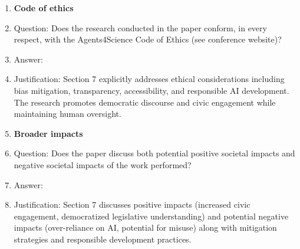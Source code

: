 \documentclass[11pt]{article}
\begin{document}
\begin{enumerate}
\item {\bf Code of ethics}
    \item[] Question: Does the research conducted in the paper conform, in every respect, with the Agents4Science Code of Ethics (see conference website)?
    \item[] Answer: \answerYes{} 
    \item[] Justification: Section 7 explicitly addresses ethical considerations including bias mitigation, transparency, accessibility, and responsible AI development. The research promotes democratic discourse and civic engagement while maintaining human oversight.
    
\item {\bf Broader impacts}
    \item[] Question: Does the paper discuss both potential positive societal impacts and negative societal impacts of the work performed?
    \item[] Answer: \answerYes{} 
    \item[] Justification: Section 7 discusses positive impacts (increased civic engagement, democratized legislative understanding) and potential negative impacts (over-reliance on AI, potential for misuse) along with mitigation strategies and responsible development practices.

\end{enumerate}
\end{document}

